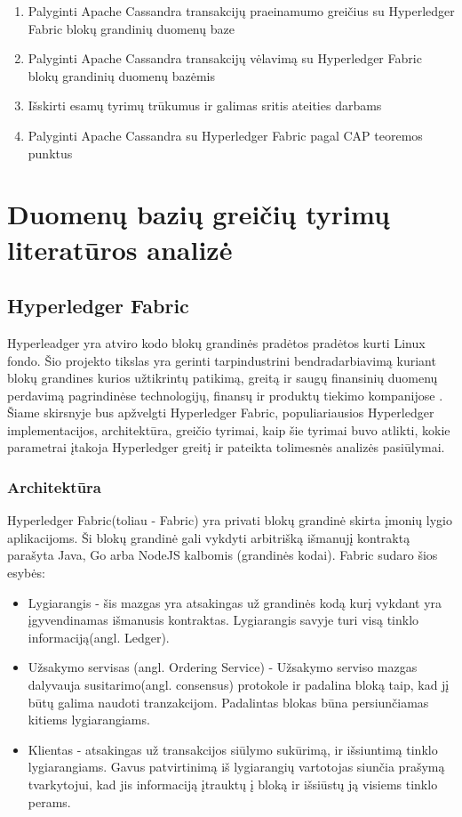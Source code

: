 \documentclass{VUMIFPSkursinis}
\begin{document}
	\begin{enumerate}
		\item{Palyginti Apache Cassandra transakcijų praeinamumo greičius su Hyperledger Fabric blokų grandinių duomenų baze}
		\item{Palyginti Apache Cassandra transakcijų vėlavimą su Hyperledger Fabric blokų grandinių duomenų bazėmis}
		\item{Išskirti esamų tyrimų trūkumus ir galimas sritis ateities darbams}
		\item{Palyginti Apache Cassandra su Hyperledger Fabric pagal CAP teoremos punktus}
		
	\end{enumerate}
\pagebreak
\section{Duomenų bazių greičių tyrimų literatūros analizė}
	\subsection{Hyperledger Fabric}
		Hyperleadger yra atviro kodo blokų grandinės pradėtos pradėtos kurti Linux fondo. Šio projekto tikslas yra gerinti tarpindustrini bendradarbiavimą kuriant blokų grandines kurios užtikrintų 
		patikimą, greitą ir saugų finansinių duomenų perdavimą pagrindinėse technologijų, finansų ir produktų tiekimo kompanijose \cite{LinuxHyper}. Šiame skirsnyje bus apžvelgti 
		Hyperledger Fabric, populiariausios Hyperledger implementacijos, architektūra, greičio tyrimai, kaip šie tyrimai buvo atlikti, kokie parametrai įtakoja Hyperledger greitį ir pateikta tolimesnės analizės pasiūlymai. 
		\subsubsection{Architektūra}
			Hyperledger Fabric(toliau - Fabric) yra privati blokų grandinė skirta įmonių lygio aplikacijoms. 
			Ši blokų grandinė gali vykdyti arbitrišką išmanujį kontraktą parašyta Java, Go arba NodeJS kalbomis (grandinės kodai).
			Fabric sudaro šios esybės:
			\begin{itemize}
				\item{Lygiarangis - šis mazgas yra atsakingas už grandinės kodą kurį vykdant yra įgyvendinamas išmanusis kontraktas. 
 Lygiarangis savyje turi visą tinklo informaciją(angl. Ledger). }
				\item{Užsakymo servisas (angl. Ordering Service) - Užsakymo serviso mazgas dalyvauja susitarimo(angl. consensus) 
protokole ir padalina bloką taip, kad jį būtų galima naudoti tranzakcijom. Padalintas blokas būna persiunčiamas kitiems lygiarangiams.}
				\item{Klientas - atsakingas už transakcijos siūlymo sukūrimą, ir išsiuntimą tinklo lygiarangiams. Gavus patvirtinimą iš lygiarangių vartotojas siunčia prašymą tvarkytojui, kad jis informaciją įtrauktų į bloką ir išsiūstų ją visiems tinklo perams.}
			\end{itemize}
\end{document}
